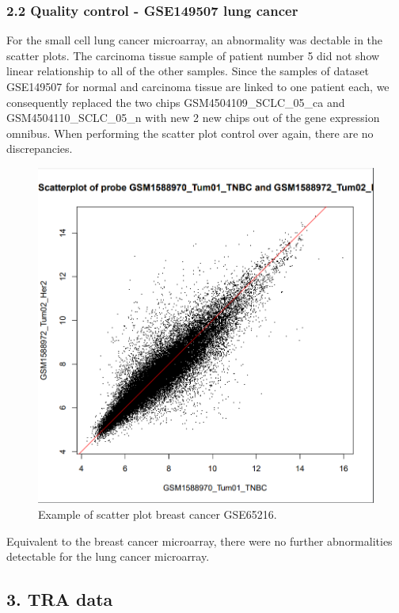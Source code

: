 \documentclass[
]{article}
\begin{document}
\hypertarget{quality-control---gse149507-lung-cancer}{%
\subsubsection{2.2 Quality control - GSE149507 lung
cancer}\label{quality-control---gse149507-lung-cancer}}

For the small cell lung cancer microarray, an abnormality was dectable
in the scatter plots. The carcinoma tissue sample of patient number 5
did not show linear relationship to all of the other samples. Since the
samples of dataset GSE149507 for normal and carcinoma tissue are linked
to one patient each, we consequently replaced the two chips
GSM4504109\_SCLC\_05\_ca and GSM4504110\_SCLC\_05\_n with new 2 new
chips out of the gene expression omnibus. When performing the scatter
plot control over again, there are no discrepancies.\\

\begin{figure}

{\centering \includegraphics[width=0.5\linewidth]{images/breast_scatter_example1} 

}

\caption{Example of scatter plot breast cancer GSE65216.}\label{fig:Broken chip - lung qc}
\end{figure}

Equivalent to the breast cancer microarray, there were no further
abnormalities detectable for the lung cancer microarray.

\hypertarget{tra-data}{%
\subsection{3. TRA data}\label{tra-data}}
\end{document}
